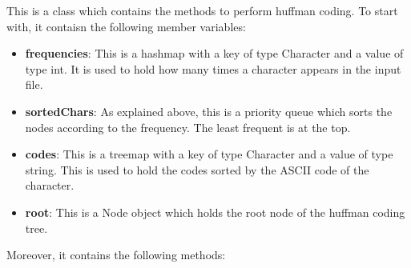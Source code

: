 \documentclass{article}
\begin{document}
		This is a class which contains the methods to perform huffman coding. To start with, it contaisn the following member variables:
		\begin{itemize}
			\item \textbf{frequencies}: This is a hashmap with a key of type Character and a value of type int. It is used to hold how many times a character appears in the input file.
			\item \textbf{sortedChars}: As explained above, this is a priority queue which sorts the nodes according to the frequency. The least frequent is at the top.
			\item \textbf{codes}: This is a treemap with a key of type Character and a value of type string. This is used to hold the codes sorted by the ASCII code of the character.
			\item \textbf{root}: This is a Node object which holds the root node of the huffman coding tree.
		\end{itemize}
		
		Moreover, it contains the following methods: 
		
\end{document}
